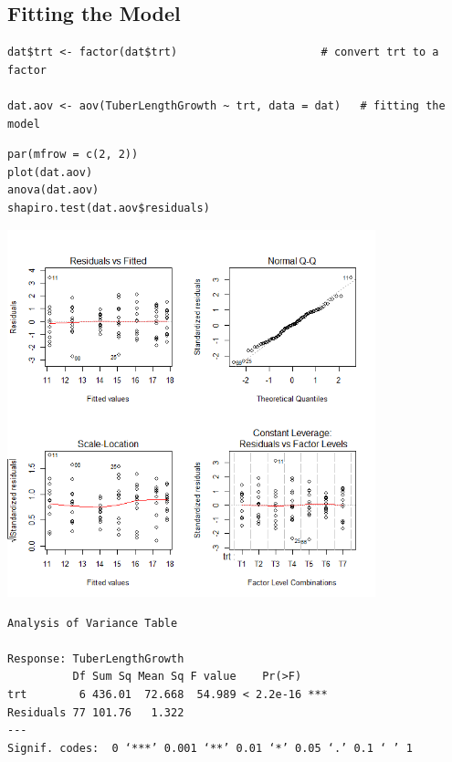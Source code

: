 \documentclass[a4paper, 10pt, fleqn, twosided]{memoir}
\begin{document}
\subsection{Fitting the Model}

\begin{tcolorbox}[title = Fitting the linear model for a CRD]
\begin{verbatim}
dat$trt <- factor(dat$trt)                      # convert trt to a factor

dat.aov <- aov(TuberLengthGrowth ~ trt, data = dat)   # fitting the model

\end{verbatim}

\tcblower
\begin{verbatim}
par(mfrow = c(2, 2))
plot(dat.aov)
anova(dat.aov)
shapiro.test(dat.aov$residuals)
\end{verbatim}
\end{tcolorbox}

\begin{tcolorbox}[title = Example 2 Output]
\includegraphics[width=0.8\textwidth, frame]{Example2Resplot.png}
\end{tcolorbox}

\begin{tcolorbox}[title = Example 2 Output]
\begin{verbatim}
Analysis of Variance Table

Response: TuberLengthGrowth
          Df Sum Sq Mean Sq F value    Pr(>F)
trt        6 436.01  72.668  54.989 < 2.2e-16 ***
Residuals 77 101.76   1.322
---
Signif. codes:  0 ‘***’ 0.001 ‘**’ 0.01 ‘*’ 0.05 ‘.’ 0.1 ‘ ’ 1

\end{verbatim}
\end{tcolorbox}
\end{document}
